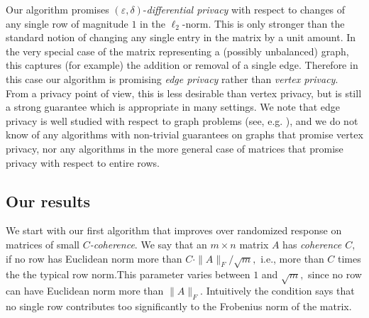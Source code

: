 \documentclass[letterpaper,11pt]{article}
\theoremstyle{definition}
\renewcommand{\epsilon}{\varepsilon}
\begin{document}
Our algorithm promises $(\epsilon,\delta)$-\emph{differential privacy}
\cite{DworkMNS06} with respect to changes of any single row of magnitude $1$ in
the $\ell_2$-norm.  This is only stronger than the standard notion of changing
any single entry in the matrix by a unit amount. In the very special case of
the matrix representing a (possibly unbalanced) graph, this captures (for
example) the addition or removal of a single edge. Therefore in this case our
algorithm is promising \emph{edge privacy} rather than \emph{vertex privacy}.
From a privacy point of view, this is less desirable than vertex privacy, but
is still a strong guarantee which is appropriate in many settings. We note
that edge privacy is well studied with respect to graph problems (see, e.g.
\cite{NissimRS07,GuptaLMRT10, GuptaRU11}), and we do not know of any
algorithms with non-trivial guarantees on graphs that promise vertex privacy,
nor any algorithms in the more general case of matrices that promise privacy
with respect to entire rows.

\subsection{Our results}

We start with our first algorithm that improves over randomized response on
matrices of small \emph{$C$-coherence}. We say that an $m\times n$
matrix $A$ has \emph{coherence $C,$} if no row has Euclidean norm more than
$C\cdot \|A\|_F/\sqrt{m},$ i.e., more than $C$ times the the typical row
norm.This parameter varies between $1$ and $\sqrt{m},$ since no row can have
Euclidean norm more than $\|A\|_F.$ Intuitively the condition says that no
single row contributes too significantly to the Frobenius norm of the matrix.
\end{document}
